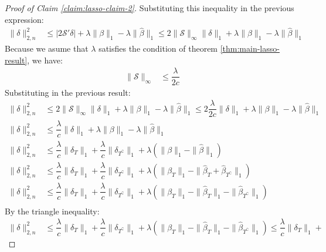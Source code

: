 \begin{proof}[Proof of Claim \ref{claim:lasso-claim-2}]
Substituting this inequality in the previous expression:
\begin{align*}
    \|\delta\|_{2, n}^{2}
    &\leq
    \left|2 \mathcal{S}' \delta\right| +
    \lambda \|\beta\|_{1} -
    \lambda \|\hat{\beta}\|_{1}
    \leq
    2 \|\mathcal{S}\|_{\infty} \|\delta\|_{1} +
    \lambda \|\beta\|_{1} -
    \lambda \|\hat{\beta}\|_{1}
\end{align*}
Because we asume that $\lambda$ satisfies the condition of theorem \ref{thm:main-lasso-result}, we have:
\begin{align*}
    \|\mathcal{S}\|_{\infty} &\leq \dfrac{\lambda}{2c}
\end{align*}
Substituting in the previous result:
\begin{align*}
    \|\delta\|_{2, n}^{2}
    &\leq
    2 \|\mathcal{S}\|_{\infty} \|\delta\|_{1} +
    \lambda \|\beta\|_{1} -
    \lambda \|\hat{\beta}\|_{1} 
    \leq
    2 \dfrac{\lambda}{2c} \|\delta\|_{1} +
    \lambda \|\beta\|_{1} -
    \lambda \|\hat{\beta}\|_{1}\\
    \|\delta\|_{2, n}^{2}
    &\leq
    \dfrac{\lambda}{c} \|\delta\|_{1} +
    \lambda \|\beta\|_{1} -
    \lambda \|\hat{\beta}\|_{1}\\
    \|\delta\|_{2, n}^{2}
    &\leq
    \dfrac{\lambda}{c} \|\delta_T\|_{1} +
    \dfrac{\lambda}{c} \|\delta_{T^{\complement}}\|_{1} +
    \lambda \left(
        \|\beta\|_{1} -
        \|\hat{\beta}\|_{1}
    \right)\\
    \|\delta\|_{2, n}^{2}
    &\leq
    \dfrac{\lambda}{c} \|\delta_T\|_{1} +
    \dfrac{\lambda}{c} \|\delta_{T^{\complement}}\|_{1} +
    \lambda \left(
        \|\beta_T\|_{1} -
        \|\hat{\beta}_T + \hat{\beta}_{T^\complement}\|_{1}
    \right)\\
    \|\delta\|_{2, n}^{2}
    &\leq
    \dfrac{\lambda}{c} \|\delta_T\|_{1} +
    \dfrac{\lambda}{c} \|\delta_{T^{\complement}}\|_{1} +
    \lambda \left(
        \|\beta_T\|_{1} -
        \|\hat{\beta}_T\|_{1} - 
        \|\hat{\beta}_{T^\complement}\|_{1}
    \right)\\
\end{align*}
By the triangle inequality:
\begin{align*}
    \|\delta\|_{2, n}^{2}
    &\leq
    \dfrac{\lambda}{c} \|\delta_T\|_{1} +
    \dfrac{\lambda}{c} \|\delta_{T^{\complement}}\|_{1} +
    \lambda \left(
        \|\beta_T\|_{1} -
        \|\hat{\beta}_T\|_{1} - 
        \|\hat{\beta}_{T^\complement}\|_{1}
    \right)
    \leq
    \dfrac{\lambda}{c} \|\delta_T\|_{1} +

\end{align*}
\end{proof}
